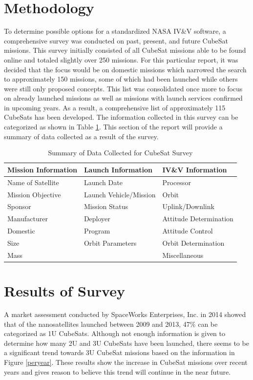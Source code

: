 \documentclass[11pt]{article}
\begin{document}
\section{Methodology}
To determine possible options for a standardized NASA IV\&V software, a comprehensive survey was conducted on past, present, and future CubeSat missions.  This survey initially consisted of all CubeSat missions able to be found online and totaled slightly over 250 missions.  For this particular report, it was decided that the focus would be on domestic missions which narrowed the search to approximately 150 missions, some of which had been launched while others were still only proposed concepts.  This list was consolidated once more to focus on already launched missions as well as missions with launch services confirmed in upcoming years.  As a result, a comprehensive list of approximately 115 CubeSats has been developed.  The information collected in this survey can be categorized as shown in Table \ref{summary}.  This section of the report will provide a summary of data collected as a result of the survey.  

\begin{table}[h]
\centering
\caption{Summary of Data Collected for CubeSat Survey}
\label{summary}
\begin{tabular}{|l|l|l|}
\hline
\textbf{Mission Information} & \textbf{Launch Information} & \textbf{IV\&V Information} \\ \hline
Name of Satellite & Launch Date & Processor \\ \hline
Mission Objective & Launch Vehicle/Mission & Orbit \\ \hline
Sponsor & Mission Status & Uplink/Downlink \\ \hline
Manufacturer & Deployer & Attitude Determination \\ \hline
Domestic & Program & Attitude Control \\ \hline
Size & Orbit Parameters & Orbit Determination \\ \hline
Mass &  & Miscellaneous \\ \hline
\end{tabular}
\end{table}

\section{Results of Survey}
A market assessment conducted by SpaceWorks Enterprises, Inc. in 2014 showed that of the nanosatellites launched between 2009 and 2013, 47\% can be categorized as 1U CubeSats.  Although not enough information is given to determine how many 2U and 3U CubeSats have been launched, there seems to be a significant trend towards 3U CubeSat missions based on the information in Figure \ref{peryear}.  These results show the increase in CubeSat missions over recent years and gives reason to believe this trend will continue in the near future.
\end{document}
